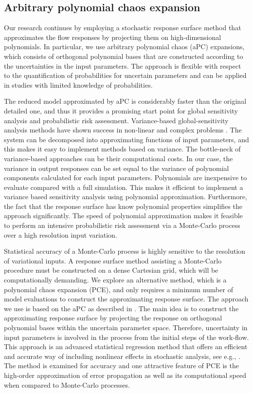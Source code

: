 \subsection{Arbitrary polynomial chaos expansion}

Our research continues by employing a stochastic response surface method that approximates the flow responses by projecting them on high-dimensional
polynomials. In particular, we use arbitrary polynomial chaos (aPC) expansions, which consists of orthogonal polynomial bases that are constructed  according
to the uncertainties in the input parameters. The approach is flexible with
respect to the quantification of probabilities for uncertain parameters and can
be applied in studies with limited knowledge of probabilities. 

The reduced model approximated by aPC is considerably faster than the original
detailed one, and thus it  provides a promising start point for global
sensitivity analysis and probabilistic risk assessment. Variance-based global-sensitivity analysis methods have shown success in non-linear and complex problems \cite{reuter2008global}.
The system can be decomposed into approximating functions of input parameters, and this makes it easy to implement methods based on variance. The bottle-neck of variance-based approaches can be their computational costs. In our case, the variance in output responses can be set equal to the variance of polynomial components calculated for each input parameters. Polynomials are inexpensive to evaluate compared with a full simulation. This makes it efficient to implement a variance based sensitivity analysis using polynomial approximation. Furthermore, the fact that the response surface has know polynomial properties simplifies the approach significantly. The speed of polynomial approximation makes it feasible to perform an
intensive probabilistic risk assessment via a Monte-Carlo process over a high resolution input variation.

Statistical accuracy of a Monte-Carlo process is highly sensitive to the
resolution of variational inputs. A response surface method assisting a
Monte-Carlo procedure must be constructed on a dense Cartesian grid, which will
be computationally demanding. We explore an alternative method, which is a polynomial chaos expansion (PCE), and only
requires a minimum number of model evaluations to construct the approximating response surface. The approach we use is based on the aPC as described in \cite{oladyshkin2011concept}. The main idea is to construct the approximating response surface by projecting the response on orthogonal polynomial bases within the uncertain parameter space. Therefore, uncertainty in input parameters is involved in the process from the initial steps of the work-flow. This approach is an advanced statistical regression method that offers an efficient and accurate way of including nonlinear effects in stochastic analysis, see e.g., \cite{Zhang_Lu_2004_JCP,foo_pcm_JCP2010, 
Fajraoui_al_2011_WRR}. The method is examined for accuracy and one attractive
feature of PCE is the high-order approximation of error propagation as well as its computational speed \cite{oladyshkinintegrative} when compared to Monte-Carlo processes.

